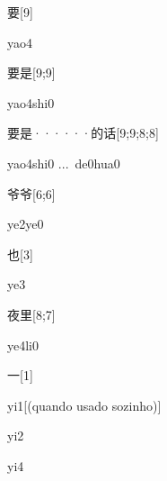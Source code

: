 \begin{verbete}[yao4]{要}[9]
\begin{pronuncia}{yao4}
\end{pronuncia}
\end{verbete}

\begin{verbete}{要是}[9;9]
\begin{pronuncia}{yao4shi0}
\end{pronuncia}
\end{verbete}

\begin{verbete}{要是······的话}[9;9;8;8]
\begin{pronuncia}[\\]{yao4shi0 ...\  de0hua0}
\end{pronuncia}
\end{verbete}

\begin{verbete}[ye2ye0]{爷爷}[6;6]
\begin{pronuncia}{ye2ye0}
\end{pronuncia}
\end{verbete}

\begin{verbete}[ye3]{也}[3]
\begin{pronuncia}{ye3}
\end{pronuncia}
\end{verbete}

\begin{verbete}[ye4li0]{夜里}[8;7]
\begin{pronuncia}{ye4li0}
\end{pronuncia}
\end{verbete}

\begin{verbete}[yi1]{一}[1]
\begin{pronuncia}[\\]{yi1}[(quando usado sozinho)]
\end{pronuncia}
\begin{pronuncia}{yi2}
\end{pronuncia}
\begin{pronuncia}{yi4}
\end{pronuncia}
\end{verbete}

